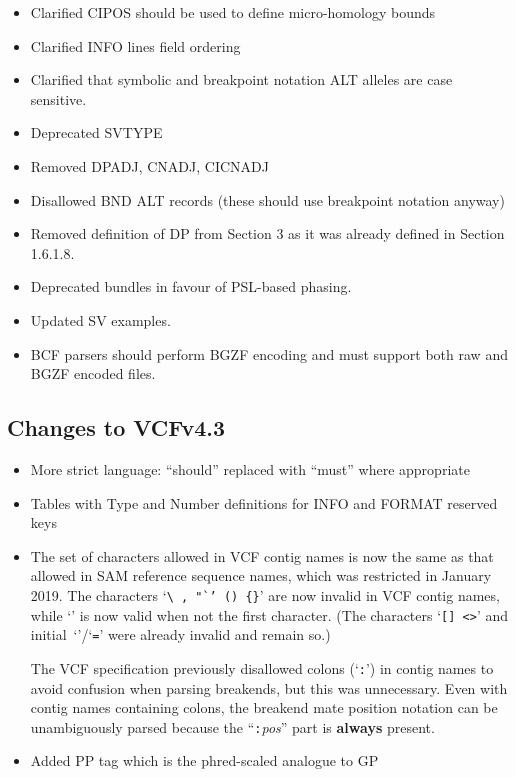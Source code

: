 \documentclass[8pt]{article}
\begin{document}
\begin{itemize}
\item Clarified CIPOS should be used to define micro-homology bounds
\item Clarified INFO lines field ordering
\item Clarified that symbolic and breakpoint notation ALT alleles are case sensitive.
\item Deprecated SVTYPE
\item Removed DPADJ, CNADJ, CICNADJ
\item Disallowed BND ALT records (these should use breakpoint notation anyway)
\item Removed definition of DP from Section 3 as it was already defined in Section 1.6.1.8.
\item Deprecated bundles in favour of PSL-based phasing.
\item Updated SV examples.
\item BCF parsers should perform BGZF encoding and must support both raw and BGZF encoded files.
\end{itemize}

\subsection{Changes to VCFv4.3}

\begin{itemize}
\item More strict language: ``should'' replaced with ``must'' where appropriate
\item Tables with Type and Number definitions for INFO and FORMAT reserved keys

\item
The set of characters allowed in VCF contig names is now the same as that allowed in SAM reference sequence names, which was restricted in January 2019.
The characters `{\tt\verb|\|\,,\,"`'\,()\,\verb|{}|}' are now invalid in VCF contig names, while `{\tt *}' is now valid when not the first character.
(The characters `{\tt []\,<>}' and initial~`{\tt *}'/`{\tt =}' were already invalid and remain so.)

The VCF specification previously disallowed colons (`{\tt :}') in contig names to avoid confusion when parsing breakends, but this was unnecessary.
Even with contig names containing colons, the breakend mate position notation can be unambiguously parsed because the ``{\tt :}\emph{pos}'' part is \textbf{always} present.
\item Added PP tag which is the phred-scaled analogue to GP
\end{itemize}
\end{document}

